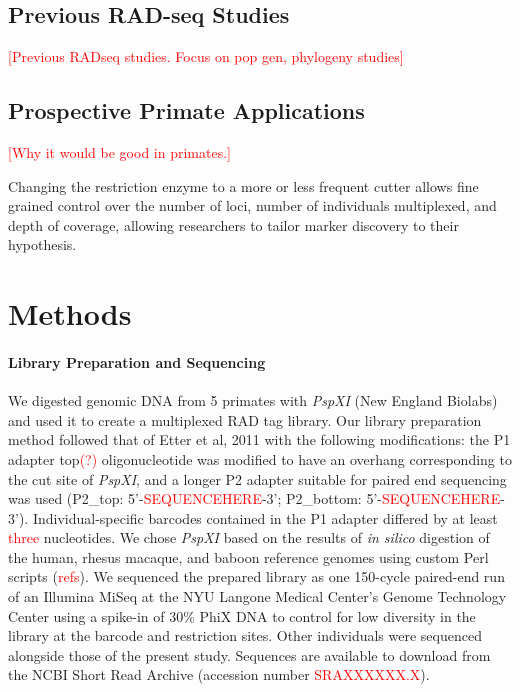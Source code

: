 \documentclass[12pt]{article}
\begin{document}
\subsection{Previous RAD-seq Studies}

\textcolor{red}{[Previous RADseq studies. Focus on pop gen, phylogeny studies]}

\subsection{Prospective Primate Applications}

\textcolor{red}{[Why it would be good in primates.]}

Changing the restriction enzyme to a more or less frequent cutter allows fine grained control over the number of loci, number of individuals multiplexed, and depth of coverage, allowing researchers to tailor marker discovery to their hypothesis. 

\section{Methods}

\paragraph{Library Preparation and Sequencing}

	We digested genomic DNA from 5 primates with \emph{PspXI} (New England Biolabs) and used it to create a multiplexed RAD tag library. Our library preparation method followed that of Etter et al, 2011 with the following modifications: the P1 adapter top\textcolor{red}{(?)} oligonucleotide was modified to have an overhang corresponding to the cut site of \emph{PspXI}, and a longer P2 adapter suitable for paired end sequencing was used (P2\_top: 5'-\textcolor{red}{SEQUENCEHERE}-3'; P2\_bottom: 5'-\textcolor{red}{SEQUENCEHERE}-3'). Individual-specific barcodes contained in the P1 adapter differed by at least \textcolor{red}{three} nucleotides. We chose \emph{PspXI} based on the results of \emph{in silico} digestion of the human, rhesus macaque, and baboon reference genomes using custom Perl scripts (\textcolor{red}{refs}). We sequenced the prepared library as one 150-cycle paired-end run of an Illumina MiSeq at the NYU Langone Medical Center's Genome Technology Center using a spike-in of 30\% PhiX DNA to control for low diversity in the library at the barcode and restriction sites. Other individuals were sequenced alongside those of the present study. Sequences are available to download from the NCBI Short Read Archive (accession number \textcolor{red}{SRAXXXXXX.X}).
\end{document}

